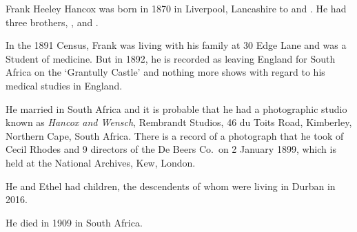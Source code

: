 
Frank Heeley Hancox was born in 1870 in Liverpool, Lancashire to  and  \cite{FHHancoxBirth}. He had three brothers, ,  and .

In the 1891 Census, Frank was living with his family at 30 Edge Lane and was a Student of medicine.\cite{FrankHeeleyHancoxResidenceUK}
But in 1892, he is recorded as leaving England for South Africa on the `Grantully Castle' \cite{FHHancoxTravel} and nothing more shows with regard to his medical studies in England.

He married  in South Africa and it is probable that he had a photographic studio known as \emph{Hancox and Wensch}, Rembrandt Studios, 46 du Toits Road, Kimberley, Northern Cape, South Africa. There is a record of a photograph that he took of Cecil Rhodes and 9 directors of the De Beers Co.\ on 2 January 1899, which is held at the National Archives, Kew, London.\cite{FHHancoxPhotos}

He and Ethel had children, the descendents of whom were living in Durban in 2016.\cite{JanKarpinski}

He died in 1909 in South Africa. \cite{FHHancoxDeath}
